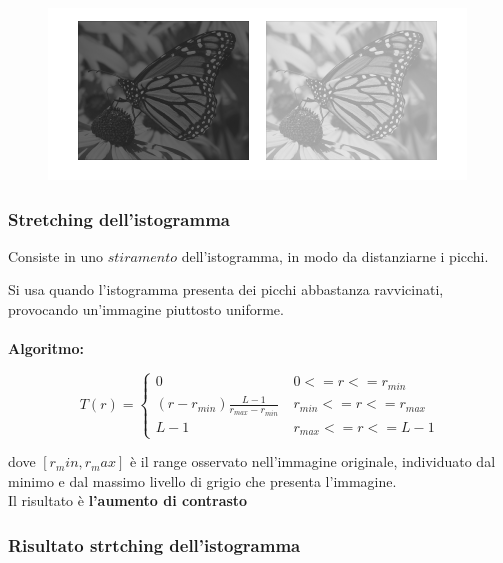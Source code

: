 \begin{figure}[H]
    \centering
    \includegraphics[width=\linewidth, keepaspectratio]{capitoli/immagini/imgs/shift-isto.png}
\end{figure}

\subsubsection{Stretching dell'istogramma}

\begin{definition}
    Consiste in uno $stiramento$ dell'istogramma, in modo da distanziarne i picchi.
\end{definition}
Si usa quando l'istogramma presenta dei picchi abbastanza ravvicinati, provocando un'immagine
piuttosto uniforme.
\\\\
\textbf{Algoritmo:}
\begin{center}
    $$
        T(r) = \left\{ \begin{array}{cl}
            0                                         & \ 0 <= r <= r_{min}       \\
            (r - r_{min}) \frac{L-1}{r_{max}-r_{min}} & \ r_{min} <= r <= r_{max} \\
            L-1                                       & \ r_{max} <= r <= L-1
        \end{array} \right.
    $$
\end{center}
dove $[r_min, r_max ]$ è il range osservato nell'immagine originale, individuato dal minimo e dal massimo livello di grigio che presenta
l'immagine.
\\Il risultato è \textbf{l'aumento di contrasto}

\subsubsection{Risultato strtching dell'istogramma}

